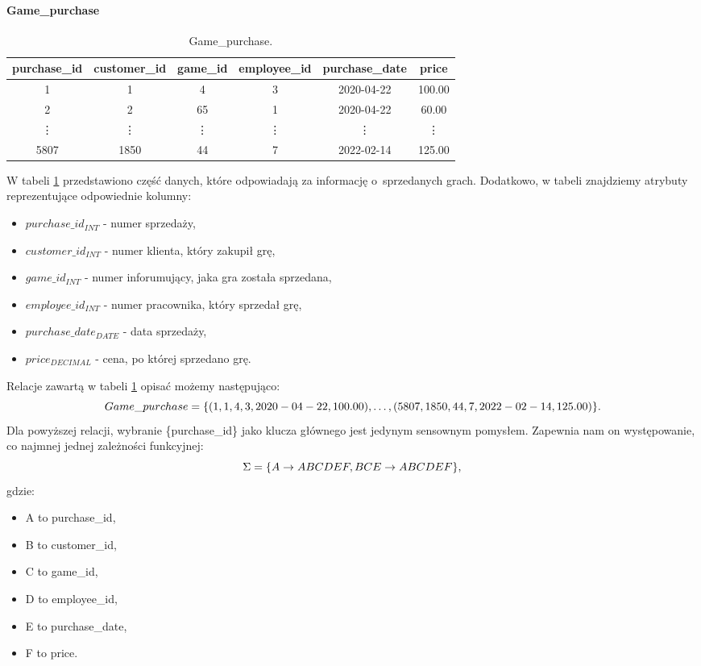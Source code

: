 \documentclass{article}
\theoremstyle{break}
\begin{document}
	
	
	
	
	\paragraph{Game\_purchase}
	\begin{table}[!ht]
		\centering
		\begin{tabular}{|c|c|c|c|c|c|}
			\hline
			purchase\_id & customer\_id & game\_id & employee\_id & purchase\_date & price \\ \hline
			1 & 1 & 4 & 3 & 2020-04-22 & 100.00\\ \hline
			2 & 2 & 65 & 1 & 2020-04-22 & 60.00\\ \hline
			\vdots & \vdots & \vdots & \vdots & \vdots & \vdots \\ \hline
			5807 & 1850 & 44 & 7 & 2022-02-14 & 125.00 \\ \hline
		\end{tabular}
		\caption{Game\_purchase.}
		\label{table:game_purchase}
	\end{table}
	W tabeli \ref{table:game_purchase} przedstawiono część danych, które odpowiadają za informację o~sprzedanych grach. Dodatkowo, w tabeli znajdziemy atrybuty reprezentujące odpowiednie kolumny:
	\begin{itemize}
		\item $purchase\_id_{INT}$ - numer sprzedaży,
		\item $customer\_id_{INT}$ - numer klienta, który zakupił grę,
		\item $game\_id_{INT}$ - numer inforumujący, jaka gra została sprzedana,
		\item $employee\_id_{INT}$ - numer pracownika, który sprzedał grę,
		\item $purchase\_date_{DATE}$ - data sprzedaży,
		\item $price_{DECIMAL}$ - cena, po której sprzedano grę.
	\end{itemize}
	Relacje zawartą w tabeli \ref{table:game_purchase} opisać możemy następująco:
	$$ Game\_purchase=\{(1, 1, 4, 3,2020\--04\--22,100.00), \dots,(	5807, 1850, 44, 7, 2022\--02\--14, 125.00)\}.  $$
	Dla powyższej relacji, wybranie \{purchase\_id\} jako klucza głównego jest jedynym sensownym pomysłem. Zapewnia nam on występowanie, co najmnej jednej zależności funkcyjnej:
	$$ \Sigma = \{A \rightarrow ABCDEF , BCE\rightarrow ABCDEF  \}, \\ $$
	gdzie:
		\begin{itemize}
		\item A to purchase\_id,
		\item B to customer\_id,
		\item C to game\_id,
		\item D to employee\_id,
		\item E to purchase\_date,
		\item F to price.
	\end{itemize}
\end{document}
